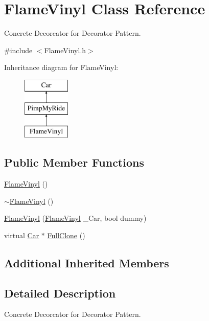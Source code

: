 \hypertarget{class_flame_vinyl}{}\section{Flame\+Vinyl Class Reference}
\label{class_flame_vinyl}


Concrete Decorcator for Decorator Pattern.  




{\ttfamily \#include $<$Flame\+Vinyl.\+h$>$}

Inheritance diagram for Flame\+Vinyl\+:\begin{figure}[H]
\begin{center}
\leavevmode
\includegraphics[height=3.000000cm]{class_flame_vinyl}
\end{center}
\end{figure}
\subsection*{Public Member Functions}
\begin{DoxyCompactItemize}
\item 
\mbox{\hyperlink{class_flame_vinyl_aa80e3ed232392bcf9358ee7a46360d79}{Flame\+Vinyl}} ()
\item 
\mbox{\hyperlink{class_flame_vinyl_ab2a4daa70f1d78eca4166e4192d295e7}{$\sim$\+Flame\+Vinyl}} ()
\item 
\mbox{\hyperlink{class_flame_vinyl_a045751a742ef319126af22d00b4ec4ea}{Flame\+Vinyl}} (\mbox{\hyperlink{class_flame_vinyl}{Flame\+Vinyl}} \+\_\+\+Car, bool dummy)
\item 
virtual \mbox{\hyperlink{class_car}{Car}} $\ast$ \mbox{\hyperlink{class_flame_vinyl_a10356b9fab01a74d2354773e0beaba8b}{Full\+Clone}} ()
\end{DoxyCompactItemize}
\subsection*{Additional Inherited Members}


\subsection{Detailed Description}
Concrete Decorcator for Decorator Pattern. 

